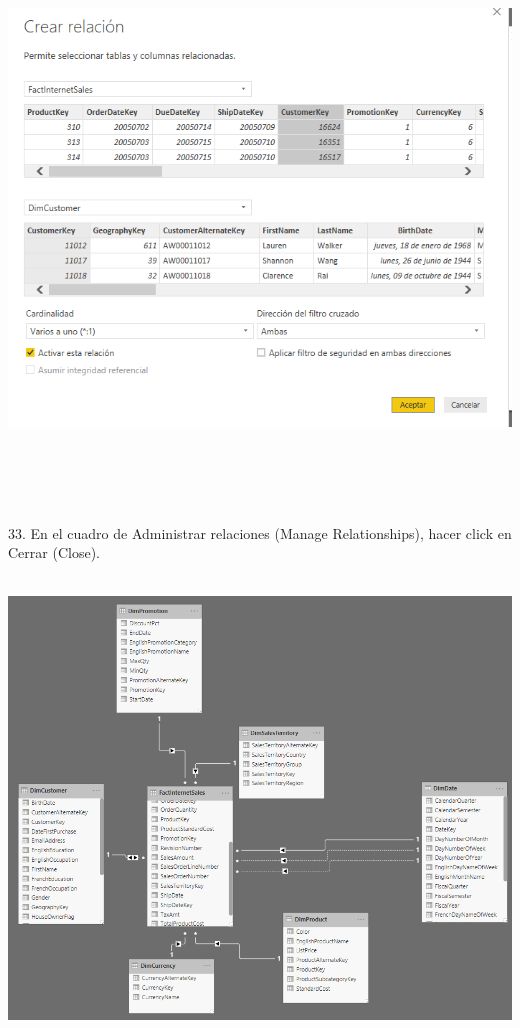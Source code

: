 \begin{flushleft}
\begin{itemize}
\begin{center}
	\includegraphics[width=20cm]{./Imagenes/img9} 
	\end{center}
\textbf{ }\\

\textbf{ }\\
\textbf{ }\\
\textbf{ }\\
33. En el cuadro de Administrar relaciones (Manage Relationships), hacer click en Cerrar (Close).\\
\textbf{ }\\

\begin{center}
	\includegraphics[width=20cm]{./Imagenes/img10} 
	\end{center}
\textbf{ }\\


\end{itemize}
\end{flushleft}
